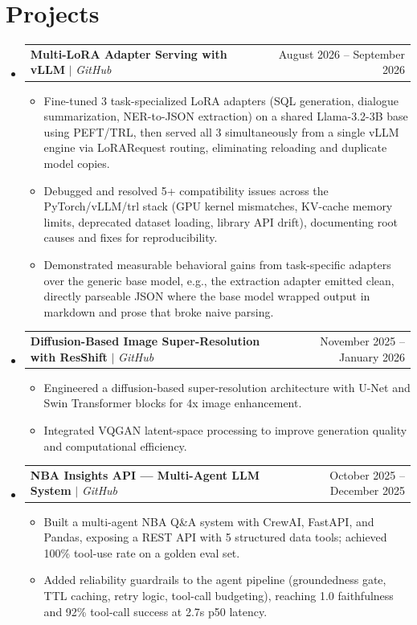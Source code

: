 \documentclass[letterpaper,10.5pt]{article}
\makeatletter
\newcommand{\resumeItem}[1]{
  \item\small{
    {#1 \vspace{-2pt}}
  }
}
\newcommand{\resumeProjectHeading}[2]{
    \item
    \begin{tabular*}{0.97\textwidth}{l@{\extracolsep{\fill}}r}
      \small#1 & #2 \\
    \end{tabular*}\vspace{-7pt}
}
\newcommand{\resumeSubHeadingListStart}{\begin{itemize}[leftmargin=0.0in, label={}]}
\newcommand{\resumeSubHeadingListEnd}{\end{itemize}}
\newcommand{\resumeItemListStart}{\begin{itemize}[leftmargin=0.15in, label=\textbullet]}
\newcommand{\resumeItemListEnd}{\end{itemize}\vspace{-5pt}}
\makeatother
\begin{document}
\section{Projects}
    \resumeSubHeadingListStart

      \resumeProjectHeading
          {\textbf{Multi-LoRA Adapter Serving with vLLM} $|$ \emph{GitHub}}{August 2026 -- September 2026}
          \resumeItemListStart
            \resumeItem{Fine-tuned 3 task-specialized LoRA adapters (SQL generation, dialogue summarization, NER-to-JSON extraction) on a shared Llama-3.2-3B base using PEFT/TRL, then served all 3 simultaneously from a single vLLM engine via LoRARequest routing, eliminating reloading and duplicate model copies.}
            \resumeItem{Debugged and resolved 5+ compatibility issues across the PyTorch/vLLM/trl stack (GPU kernel mismatches, KV-cache memory limits, deprecated dataset loading, library API drift), documenting root causes and fixes for reproducibility.}
            \resumeItem{Demonstrated measurable behavioral gains from task-specific adapters over the generic base model, e.g., the extraction adapter emitted clean, directly parseable JSON where the base model wrapped output in markdown and prose that broke naive parsing.}
          \resumeItemListEnd

      \resumeProjectHeading
          {\textbf{Diffusion-Based Image Super-Resolution with ResShift} $|$ \emph{GitHub}}{November 2025 -- January 2026}
          \resumeItemListStart
            \resumeItem{Engineered a diffusion-based super-resolution architecture with U-Net and Swin Transformer blocks for 4x image enhancement.}
            \resumeItem{Integrated VQGAN latent-space processing to improve generation quality and computational efficiency.}
          \resumeItemListEnd

      \resumeProjectHeading
          {\textbf{NBA Insights API --- Multi-Agent LLM System} $|$ \emph{GitHub}}{October 2025 -- December 2025}
          \resumeItemListStart
            \resumeItem{Built a multi-agent NBA Q\&A system with CrewAI, FastAPI, and Pandas, exposing a REST API with 5 structured data tools; achieved 100\% tool-use rate on a golden eval set.}
            \resumeItem{Added reliability guardrails to the agent pipeline (groundedness gate, TTL caching, retry logic, tool-call budgeting), reaching 1.0 faithfulness and 92\% tool-call success at 2.7s p50 latency.}
          \resumeItemListEnd

    \resumeSubHeadingListEnd

\end{document}
